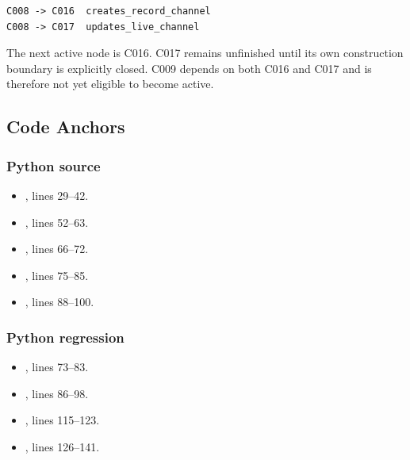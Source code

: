 \begin{verbatim}
C008 -> C016  creates_record_channel
C008 -> C017  updates_live_channel
\end{verbatim}

The next active node is C016. C017 remains unfinished until its own
construction boundary is explicitly closed. C009 depends on both C016
and C017 and is therefore not yet eligible to become active.

\subsection{Code Anchors}\label{code-anchors-16}

\subsubsection{Python source}\label{python-source-13}

\begin{itemize}
\tightlist
\item
  \texttt{\protect{}}, lines 29--42.
\item
  \texttt{\protect{}}, lines 52--63.
\item
  \texttt{\protect{}}, lines 66--72.
\item
  \texttt{\protect{}}, lines 75--85.
\item
  \texttt{\protect{}}, lines 88--100.
\end{itemize}

\subsubsection{Python regression}\label{python-regression}

\begin{itemize}
\tightlist
\item
  \texttt{\protect{}},
  lines 73--83.
\item
  \texttt{\protect{}}, lines
  86--98.
\item
  \texttt{\protect{}}, lines
  115--123.
\item
  \texttt{\protect{}},
  lines 126--141.
\end{itemize}

